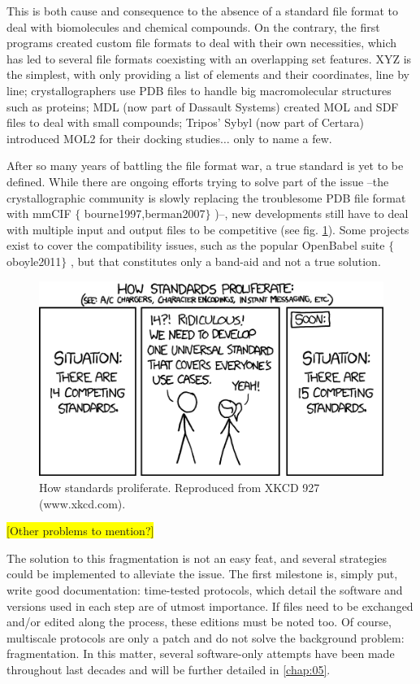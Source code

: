 This is both cause and consequence to the absence of a standard file format to deal with biomolecules and chemical compounds. On the contrary, the first programs created custom file formats to deal with their own necessities, which has led to several file formats coexisting with an overlapping set features. XYZ is the simplest, with only providing a list of elements and their coordinates, line by line; crystallographers use PDB files to handle big macromolecular structures such as proteins; MDL (now part of Dassault Systems) created MOL and SDF files to deal with small compounds; Tripos’ Sybyl (now part of Certara) introduced MOL2 for their docking studies$ \ldots $  only to name a few.




After so many years of battling the file format war, a true standard is yet to be defined. While there are ongoing efforts trying to solve part of the issue --the crystallographic community is slowly replacing the troublesome PDB file format with mmCIF $ \{ $ bourne1997,berman2007$ \} $ )--, new developments still have to deal with multiple input and output files to be competitive (see fig. \ref{fig:xkcd}). Some projects exist to cover the compatibility issues, such as the popular OpenBabel suite $ \{ $ oboyle2011$ \} $ , but that constitutes only a band-aid and not a true solution.

\begin{figure}[H]
	\includegraphics[width=\textwidth]{./figures/01/xkcd927.png}
	\caption[Proliferation of standards]{How standards proliferate. Reproduced from XKCD 927 (www.xkcd.com).}
	\label{fig:xkcd}
\end{figure}


\colorbox{yellow}{ [Other problems to mention?]}

The solution to this fragmentation is not an easy feat, and several strategies could be implemented to alleviate the issue. The first milestone is, simply put, write good documentation: time-tested protocols, which detail the software and versions used in each step are of utmost importance. If files need to be exchanged and/or edited along the process, these editions must be noted too. Of course, multiscale protocols are only a patch and do not solve the background problem: fragmentation. In this matter, several software-only attempts have been made throughout last decades and will be further detailed in \autoref{chap:05}.

